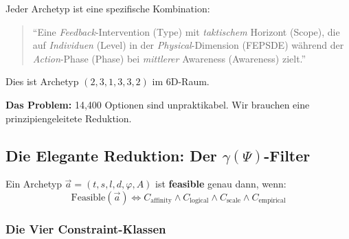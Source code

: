 \begin{tcolorbox}[colback=yellow!5!white, colframe=yellow!75!black,
    title=Warum so viele?]
Jeder Archetyp ist eine spezifische Kombination:
\begin{quote}
``Eine \textit{Feedback}-Intervention (Type) mit \textit{taktischem} Horizont (Scope), die auf \textit{Individuen} (Level) in der \textit{Physical}-Dimension (FEPSDE) während der \textit{Action}-Phase (Phase) bei \textit{mittlerer} Awareness (Awareness) zielt.''
\end{quote}

Dies ist Archetyp $(2, 3, 1, 3, 3, 2)$ im 6D-Raum.
\end{tcolorbox}

\textbf{Das Problem:} 14,400 Optionen sind unpraktikabel. Wir brauchen eine prinzipiengeleitete Reduktion.


\subsection{Die Elegante Reduktion: Der $\gamma(\Psi)$-Filter}
\label{sec:17-reduction}

\begin{tcolorbox}[colback=green!5!white, colframe=green!75!black,
    title=\textbf{Theorem HHH-T8: Feasibility Constraint System}]

Ein Archetyp $\vec{a} = (t, s, l, d, \varphi, A)$ ist \textbf{feasible} genau dann, wenn:
\begin{equation}
\boxed{\text{Feasible}(\vec{a}) \iff C_{\text{affinity}} \wedge C_{\text{logical}} \wedge C_{\text{scale}} \wedge C_{\text{empirical}}}
\label{eq:17-feasibility}
\end{equation}

\end{tcolorbox}

\subsubsection{Die Vier Constraint-Klassen}

